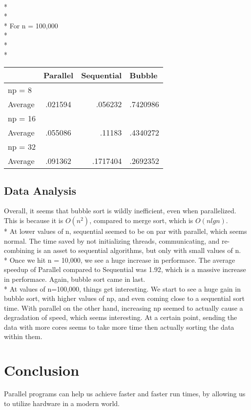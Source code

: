 \documentclass[dvips]{article}
\begin{document}
\\*
\\*
\\*
For n = 100,000
\\*
\\*
\\*
\begin{tabular}{ l | c r l }
   & Parallel & Sequential & Bubble \\
  \hline
  np = 8  &  &  & \\
  Average & .021594 & .056232 & .7420986 \\
  \hline
  np = 16  &  &  & \\
  Average & .055086 & .11183 & .4340272 \\
  \hline
  np = 32  &  &  & \\
  Average & .091362 & .1717404 & .2692352 \\
\end{tabular}
\subsection{Data Analysis}

Overall, it seems that bubble sort is wildly inefficient, even when parallelized. This is because it is $O(n^2)$, compared to merge sort, which is $O(n lg n)$. 
\\*
At lower values of n, sequential seemed to be on par with parallel, which seems normal. The time saved by not initializing threads, communicating, and re-combining is an asset to sequential algorithms, but only with small values of n.
\\*
Once we hit n = 10,000, we see a huge increase in performace. The average speedup of Parallel compared to Sequential was 1.92, which is a massive increase in performace. Again, bubble sort came in last.
\\*
At values of n=100,000, things get interesting. We start to see a huge gain in bubble sort, with higher values of np, and even coming close to a sequential sort time. With parallel on the other hand, increasing np seemed to actually cause a degradation of speed, which seems interesting. At a certain point, sending the data with more cores seems to take more time then actually sorting the data within them.

\section*{Conclusion}

Parallel programs can help us achieve faster and faster run times, by allowing us to utilize hardware in a modern world. 
\end{document}

